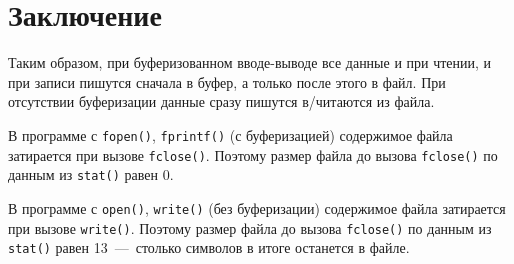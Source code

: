 \chapter{Заключение}
Таким образом, при буферизованном вводе-выводе все данные и при чтении, и при записи пишутся сначала в буфер, а только после этого в файл. При отсутствии буферизации данные сразу пишутся в/читаются из файла. 

В программе с \texttt{fopen()}, \texttt{fprintf()} (с буферизацией) содержимое файла затирается при вызове \texttt{fclose()}. Поэтому размер файла до вызова \texttt{fclose()} по данным из \texttt{stat()} равен 0.

В программе с \texttt{open()}, \texttt{write()} (без буферизации) содержимое файла затирается при вызове \texttt{write()}. Поэтому размер файла до вызова \texttt{fclose()} по данным из \texttt{stat()} равен 13~---~столько символов в итоге останется в файле.





